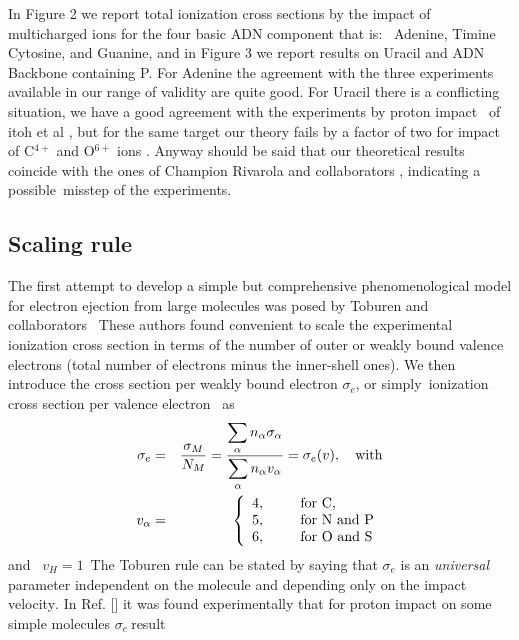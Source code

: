 \documentclass[preprint,showpacs,pra]{revtex4}
\begin{document}
In Figure 2 we report total ionization cross sections by the impact of
multicharged ions for the four basic ADN component that is: \ Adenine,
Timine Cytosine, and Guanine, and in Figure 3 we report results on Uracil
and ADN Backbone containing P. For Adenine the agreement with the three
experiments available in our range of validity are quite good. For Uracil
there is a conflicting situation, we have a good agreement with the
experiments by proton impact \ of itoh et al \cite{itoh2013}, but for the
same target our theory fails by a factor of two for impact of C$^{4+}$ and O$%
^{6+}$ ions . Anyway should be said that our theoretical results coincide
with the ones of Champion Rivarola and collaborators \cite%
{champion2012,agnihotri2012}, indicating a possible\ misstep of the
experiments.

\subsection{Scaling rule}

The first attempt to develop a simple but comprehensive phenomenological
model for electron ejection from large molecules was posed by Toburen and
collaborators \cite{toburen1975,toburen1976} \ These authors found
convenient to scale the experimental ionization cross section in terms of
the number of outer or weakly bound valence electrons (total number of
electrons minus the inner-shell ones). We then introduce the cross section
per weakly bound electron $\sigma _{e}$, or simply\ ionization cross section
per valence electron \ as%
\begin{eqnarray}
\sigma _{e} &=&\frac{\sigma _{M}}{N_{M}}=\frac{\dsum\limits_{\alpha
}n_{\alpha }\sigma _{\alpha }}{\dsum\limits_{\alpha }n_{\alpha }v_{\alpha }}%
=\sigma _{e}(v),\text{ with}  \label{27} \\
v_{\alpha } &=&\left\{ 
\begin{array}{ll}
4,\ \ \  & \text{for C,} \\ 
5, & \text{for N and P} \\ 
6, & \text{for O and S}%
\end{array}%
\right.
\end{eqnarray}%
and \ $v_{H}=1$\ The Toburen rule can be stated by saying that $\sigma _{e}$
is an \textit{universal} parameter independent on the molecule and depending
only on the impact velocity$.$ In Ref. [\cite{toburen1976}] it was found
experimentally that for proton impact on some simple molecules $\sigma _{e}\ 
$result
\end{document}
